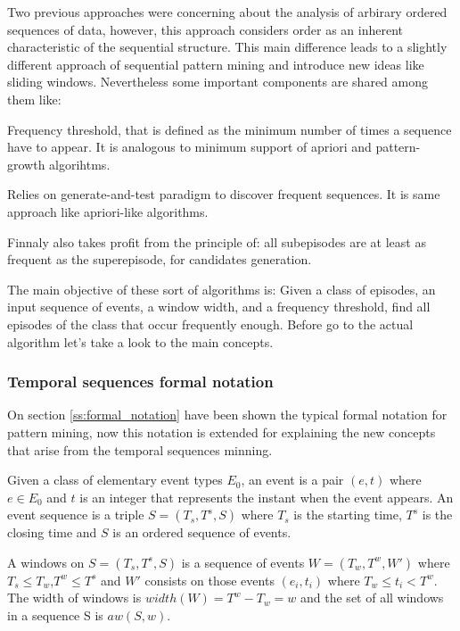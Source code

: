 Two previous approaches were concerning about the analysis of arbirary ordered
sequences of data, however, this approach considers order as an inherent
characteristic of the sequential structure. This main difference leads to a
slightly different approach of sequential pattern mining and introduce new ideas 
like sliding windows. Nevertheless some important components are shared among 
them like:
\begin{enumerate*}[label=(\roman*)]
  \item Frequency threshold, that is defined as the minimum number of times a
    sequence have to appear. It is analogous to minimum support of apriori and
    pattern-growth algorihtms.
  \item Relies on generate-and-test paradigm to discover frequent sequences. It
    is same approach like apriori-like algorithms.
  \item Finnaly also takes profit from the principle of: all subepisodes are at
    least as frequent as the superepisode, for candidates generation.
\end{enumerate*}

The main objective of these sort of algorithms is: Given a class of episodes, an
input sequence of events, a window width, and a frequency threshold, find all
episodes of the class that occur frequently enough. Before go to the actual
algorithm let's take a look to the main concepts.

\subsubsection{Temporal sequences formal notation}

On section \ref{ss:formal_notation} have been shown the typical formal notation
for pattern mining, now this notation is extended for explaining the new
concepts that arise from the temporal sequences minning.

Given a class of elementary event types $E_{0}$, an event is a pair $(e,t)$
where $e \in E_{0}$ and $t$ is an integer that represents the instant when
the event appears. An event sequence is a triple $S=(T_{s},T^{s},S)$ where
$T_{s}$ is the starting time, $T^{s}$ is the closing time and $S$ is an ordered
sequence of events.

A windows on $S=(T_{s},T^{s},S)$ is a sequence of events $W=(T_{w},T^{w},W')$
where $T_{s} \leq T_{w}$,$T^{w} \leq T^{s}$ and $W'$ consists on those events
$(e_{i},t_{i})$ where $T_{w} \leq t_{i} < T^{w}$. The width of windows is
$width(W)=T^{w}-T_{w}=w$ and the set of all windows in a sequence S is
$aw(S,w)$. 

